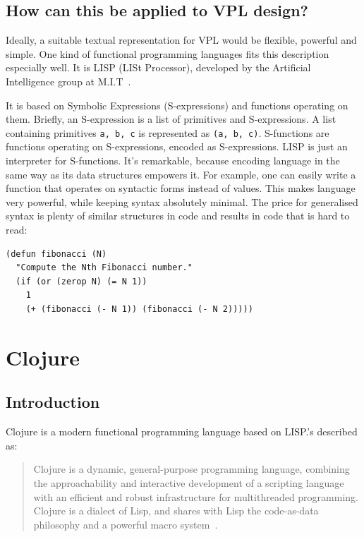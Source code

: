 \documentclass[english,mgr,shortabstract]{iithesis}
\begin{document}
\section{How can this be applied to VPL design?}

Ideally, a suitable textual representation for VPL would be flexible, powerful
and simple.
One kind of functional programming languages fits this description especially
well.
It is LISP (LISt Processor), developed by the Artificial Intelligence group at
M.I.T~\cite{recursive}.

It is based on Symbolic Expressions (S-expressions) and functions operating on
them.
Briefly, an S-expression is a list of primitives and S-expressions.
A list containing primitives \lstinline|a, b, c| is represented as \lstinline|(a, b, c)|.
S-functions are functions operating on S-expressions, encoded as S-expressions.
LISP is just an interpreter for S-functions.
It’s remarkable, because encoding language in the same way as its data
structures empowers it.
For example, one can easily write a function that operates on syntactic forms
instead of values.
This makes language very powerful, while keeping syntax absolutely minimal.
The price for generalised syntax is plenty of similar structures in code and
results in code that is hard to read:

\begin{lstlisting}
(defun fibonacci (N)
  "Compute the Nth Fibonacci number."
  (if (or (zerop N) (= N 1))
    1
    (+ (fibonacci (- N 1)) (fibonacci (- N 2)))))
\end{lstlisting}

\chapter{Clojure}
\section{Introduction}
Clojure is a modern functional programming language based on LISP.\@It’s
described as:

\blockquote{Clojure is a dynamic, general-purpose
  programming language, combining the approachability and interactive
  development of a scripting language with an efficient and robust
  infrastructure for multithreaded programming. Clojure is a dialect of Lisp,
  and shares with Lisp the code-as-data philosophy and a powerful macro
  system~\cite{clojure_website}.}
\end{document}
